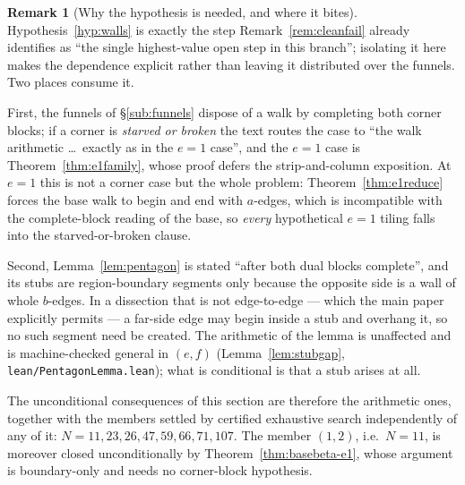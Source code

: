 \documentclass[11pt,reqno]{amsart}
\theoremstyle{plain}
\theoremstyle{definition}
\newtheorem{remark}[theorem]{Remark}
\begin{document}
\begin{remark}[Why the hypothesis is needed, and where it bites]\label{rem:whyhyp}
Hypothesis~\ref{hyp:walls} is exactly the step Remark~\ref{rem:cleanfail} already identifies as
``the single highest-value open step in this branch''; isolating it here makes the dependence
explicit rather than leaving it distributed over the funnels. Two places consume it.

First, the funnels of \S\ref{sub:funnels} dispose of a walk by completing both corner blocks; if a
corner is \emph{starved or broken} the text routes the case to ``the walk arithmetic \dots\ exactly
as in the $e=1$ case'', and the $e=1$ case is Theorem~\ref{thm:e1family}, whose proof defers the
strip-and-column exposition. At $e=1$ this is not a corner case but the whole problem:
Theorem~\ref{thm:e1reduce} forces the base walk to begin and end with $a$-edges, which is
incompatible with the complete-block reading of the base, so \emph{every} hypothetical $e=1$ tiling
falls into the starved-or-broken clause.

Second, Lemma~\ref{lem:pentagon} is stated ``after both dual blocks complete'', and its stubs are
region-boundary segments only because the opposite side is a wall of whole $b$-edges. In a
dissection that is not edge-to-edge --- which the main paper explicitly permits --- a far-side edge
may begin inside a stub and overhang it, so no such segment need be created. The arithmetic of the
lemma is unaffected and is machine-checked general in $(e,f)$
(Lemma~\ref{lem:stubgap}, \texttt{lean/PentagonLemma.lean}); what is conditional is that a stub
arises at all.

The unconditional consequences of this section are therefore the arithmetic ones, together with the
members settled by certified exhaustive search independently of any of it: $N=11,23,26,47,59,66,71,107$.
The member $(1,2)$, i.e.\ $N=11$, is moreover closed unconditionally by
Theorem~\ref{thm:basebeta-e1}, whose argument is boundary-only and needs no corner-block hypothesis.
\end{remark}
\end{document}
